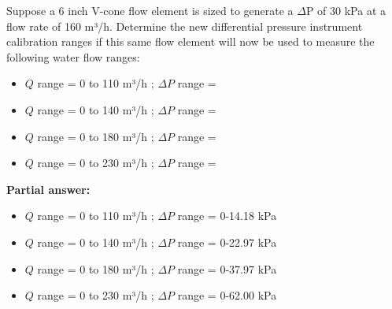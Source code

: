 

Suppose a 6 inch V-cone flow element is sized to generate a $\Delta$P of 30 kPa at a flow rate of 160 m³/h.  Determine the new differential pressure instrument calibration ranges if this same flow element will now be used to measure the following water flow ranges:

\begin{itemize}
\item{} $Q$ range = 0 to 110 m³/h ; $\Delta P$ range = \underbar{\hskip 50pt}
\vskip 5pt
\item{} $Q$ range = 0 to 140 m³/h ; $\Delta P$ range = \underbar{\hskip 50pt}
\vskip 5pt
\item{} $Q$ range = 0 to 180 m³/h ; $\Delta P$ range = \underbar{\hskip 50pt}
\vskip 5pt
\item{} $Q$ range = 0 to 230 m³/h ; $\Delta P$ range = \underbar{\hskip 50pt}
\end{itemize}

%







\noindent
{\bf Partial answer:}

\begin{itemize}
\item{} $Q$ range = 0 to 110 m³/h ; $\Delta P$ range = 0-14.18 kPa
\vskip 5pt
\item{} $Q$ range = 0 to 140 m³/h ; $\Delta P$ range = 0-22.97 kPa
\vskip 5pt
\item{} $Q$ range = 0 to 180 m³/h ; $\Delta P$ range = 0-37.97 kPa
\vskip 5pt
\item{} $Q$ range = 0 to 230 m³/h ; $\Delta P$ range = 0-62.00 kPa
\end{itemize}

